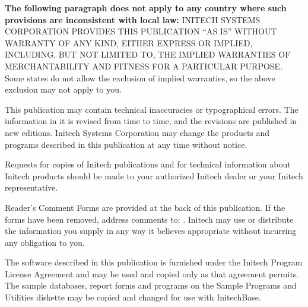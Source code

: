 \begin{TitleVerso}
{\imLegalFont
\textbf{The following paragraph does not apply to any country where such
provisions are inconsistent with local law:} INITECH SYSTEMS CORPORATION
PROVIDES THIS PUBLICATION ``AS IS'' WITHOUT WARRANTY OF ANY KIND, EITHER
EXPRESS OR IMPLIED, INCLUDING, BUT NOT LIMITED TO, THE IMPLIED WARRANTIES OF
MERCHANTABILITY AND FITNESS FOR A PARTICULAR PURPOSE.  Some states do not
allow the exclusion of implied warranties, so the above exclusion may not
apply to you.\par
This publication may contain technical inaccuracies or typographical errors.
The information in it is revised from time to time, and the revisions are
published in new editions.  Initech Systems Corporation may change the
products and programs described in this publication at any time without
notice.\par
Requests for copies of Initech publications and for technical information
about Initech products should be made to your authorized Initech dealer or
your Initech representative.\par}

{\footnotesize
Reader's Comment Forms are provided at the back of this publication.  If the
forms have been removed, address comments to: \InitechAddressLine.
Initech may use or distribute the information you supply in any way it
believes appropriate without incurring any obligation to you.\par
The software described in this publication is furnished under the Initech
Program License Agreement and may be used and copied only as that agreement
permits.  The sample databases, report forms and programs on the Sample
Programs and Utilities diskette may be copied and changed for use with
InitechBase.\par}
\end{TitleVerso}

